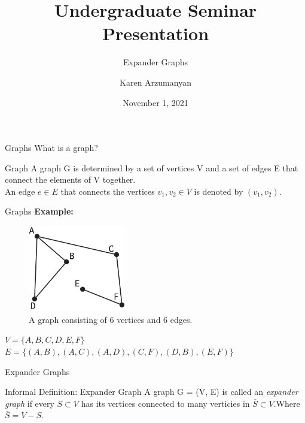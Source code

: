\documentclass[10pt]{beamer}
\title{Undergraduate Seminar Presentation}
\subtitle{Expander Graphs}
\author{Karen Arzumanyan}
\date{November 1, 2021}
\begin{document}

\begin{frame}
\maketitle
\end{frame}

\begin{frame}[t]{Graphs}
    \vspace{2em}
    What is a graph?
    \vspace{3em}
    \pause{}
    \begin{block}{Graph}
        A graph G is determined by a set of vertices V and a set of edges E that connect the elements of V together. \\
        An edge $e \in E$ that connects the vertices $v_1,v_2 \in V$ is denoted by $(v_1, v_2)$.
    \end{block}
    
\end{frame}

\begin{frame}[t]{Graphs}
    \textbf{Example:}\\
    \begin{figure}
        \centering
        \includegraphics[width=120pt]{Graph}
        \caption{A graph consisting of 6 vertices and 6 edges.}
    \end{figure}
    \pause{}
    $V = \{A, B, C, D, E, F\}$\\
    \pause{}
    $E = \{(A,B), (A,C), (A,D), (C, F), (D, B), (E, F)\}$
\end{frame}

\begin{frame}[t]{Expander Graphs}
    \vspace{7em}
    \begin{block}{Informal Definition: Expander Graph}
        \vspace{0.5em}
        A graph G = (V, E) is called an \textit{expander graph} if every $S \subset V$ has its vertices connected to many verticies in $\bar{S} \subset V$.\newline Where $\bar{S} = V - S$.
        \vspace{0.5em}
    \end{block}
\end{frame}
\end{document}
